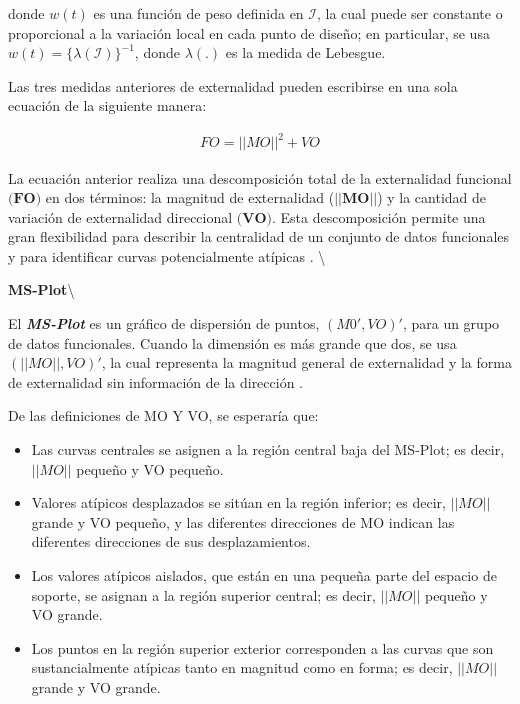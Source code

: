 \documentclass[
]{book}
\begin{document}
donde \(w(t)\) es una función de peso definida en \(\mathcal{I}\), la cual puede ser constante o proporcional a la variación local en cada punto de diseño; en particular, se usa \(w(t)=\{\lambda(\mathcal{I})\}^{-1}\), donde \(\lambda(.)\) es la medida de Lebesgue.

Las tres medidas anteriores de externalidad pueden escribirse en una sola ecuación de la siguiente manera:

\begin{align}
    FO=||MO||^2 +VO
\end{align}

La ecuación anterior realiza una descomposición total de la externalidad funcional \(\textbf{(FO)}\) en dos términos: la magnitud de externalidad (\(||\textbf{MO}||\)) y la cantidad de variación de externalidad direccional \(\textbf{(VO)}\). Esta descomposición permite una gran flexibilidad para describir la centralidad de un conjunto de datos funcionales y para identificar curvas potencialmente atípicas \citep{dai}. \textbackslash{}

\textbf{MS-Plot}\textbackslash{}

El \textbf{\textit{MS-Plot}} es un gráfico de dispersión de puntos, \((M0',VO)'\), para un grupo de datos funcionales. Cuando la dimensión es más grande que dos, se usa \((||MO||,VO)'\), la cual representa la magnitud general de externalidad y la forma de externalidad sin información de la dirección \citep{dai}.

De las definiciones de MO Y VO, se esperaría que:

\begin{itemize}
\item
  Las curvas centrales se asignen a la región central baja del MS-Plot; es decir, \(||MO||\) pequeño y VO pequeño.
\item
  Valores atípicos desplazados se sitúan en la región inferior; es decir, \(||MO||\) grande y VO pequeño, y las diferentes direcciones de MO indican las diferentes direcciones de sus desplazamientos.
\item
  Los valores atípicos aislados, que están en una pequeña parte del espacio de soporte, se asignan a la región superior central; es decir, \(||MO||\) pequeño y VO grande.
\item
  Los puntos en la región superior exterior corresponden a las curvas que son sustancialmente atípicas tanto en magnitud como en forma; es decir, \(||MO||\) grande y VO grande.
\end{itemize}
\end{document}
